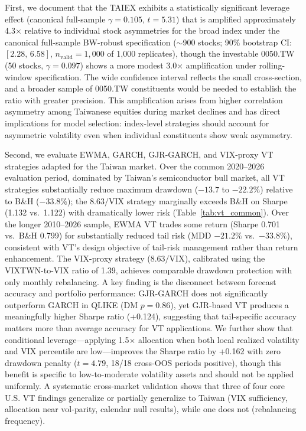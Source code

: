 First, we document that the TAIEX exhibits a statistically significant leverage effect (canonical full-sample $\gamma = 0.105$, $t = 5.31$) that is amplified approximately 4.3$\times$ relative to individual stock asymmetries for the broad index under the canonical full-sample BW-robust specification ($\sim$900 stocks; 90\% bootstrap CI: $[2.28, \, 6.58]$, $n_{\text{valid}}=1{,}000$ of 1,000 replicates), though the investable 0050.TW (50 stocks, $\gamma = 0.097$) shows a more modest 3.0$\times$ amplification under rolling-window specification. The wide confidence interval reflects the small cross-section, and a broader sample of 0050.TW constituents would be needed to establish the ratio with greater precision. This amplification arises from higher correlation asymmetry among Taiwanese equities during market declines and has direct implications for model selection: index-level strategies should account for asymmetric volatility even when individual constituents show weak asymmetry.

Second, we evaluate EWMA, GARCH, GJR-GARCH, and VIX-proxy VT strategies adapted for the Taiwan market. Over the common 2020--2026 evaluation period, dominated by Taiwan's semiconductor bull market, all VT strategies substantially reduce maximum drawdown ($-13.7$ to $-22.2\%$) relative to B\&H ($-33.8\%$); the $8.63/\text{VIX}$ strategy marginally exceeds B\&H on Sharpe (1.132 vs.\ 1.122) with dramatically lower risk (Table~\ref{tab:vt_common}). Over the longer 2010--2026 sample, EWMA VT trades some return (Sharpe 0.701 vs.\ B\&H 0.799) for substantially reduced tail risk (MDD $-21.2\%$ vs.\ $-33.8\%$), consistent with VT's design objective of tail-risk management rather than return enhancement. The VIX-proxy strategy ($8.63/\text{VIX}$), calibrated using the VIXTWN-to-VIX ratio of 1.39, achieves comparable drawdown protection with only monthly rebalancing. A key finding is the disconnect between forecast accuracy and portfolio performance: GJR-GARCH does not significantly outperform GARCH in QLIKE (DM $p = 0.86$), yet GJR-based VT produces a meaningfully higher Sharpe ratio (+0.124), suggesting that tail-specific accuracy matters more than average accuracy for VT applications. We further show that conditional leverage---applying 1.5$\times$ allocation when both local realized volatility and VIX percentile are low---improves the Sharpe ratio by +0.162 with zero drawdown penalty ($t = 4.79$, 18/18 cross-OOS periods positive), though this benefit is specific to low-to-moderate volatility assets and should not be applied uniformly. A systematic cross-market validation shows that three of four core U.S. VT findings generalize or partially generalize to Taiwan (VIX sufficiency, allocation near vol-parity, calendar null results), while one does not (rebalancing frequency).


